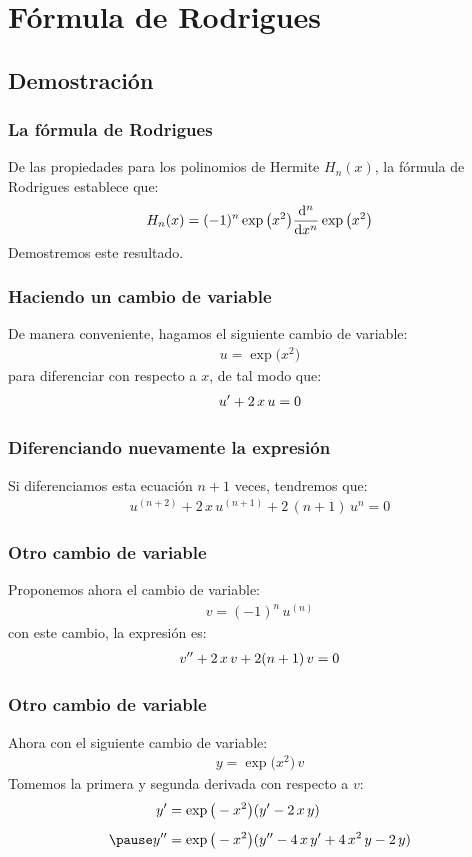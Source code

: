 \documentclass[12pt]{beamer}
\begin{document}
\section{Fórmula de Rodrigues}
\subsection{Demostración}

\begin{frame}
\frametitle{La fórmula de Rodrigues}
De las propiedades para los polinomios de Hermite $H_{n} (x)$, la fórmula de Rodrigues establece que:
\pause
\begin{align*}
H_{n} (x) = (-1)^{n} \exp\big( x^{2} \big) \dv[n]{x} \exp\big( x^{2} \big)
\end{align*}
\pause
Demostremos este resultado.
\end{frame}
\begin{frame}
\frametitle{Haciendo un cambio de variable}
De manera conveniente, hagamos el siguiente cambio de variable:
\pause
\begin{align*}
u =  \exp\big( x^{2} \big)
\end{align*}
\pause
para diferenciar con respecto a $x$, de tal modo que:
\pause
\begin{align*}
{u}^{\prime} + 2 \, x \, u = 0
\end{align*}
\end{frame}
\begin{frame}
\frametitle{Diferenciando nuevamente la expresión}
Si diferenciamos esta ecuación $n + 1$ veces, tendremos que:
\pause
\begin{align*}
u^{(n+2)} + 2 \, x \, u^{(n+1)} +  2 \, (n + 1) \, u^{n} = 0
\end{align*}
\end{frame}
\begin{frame}
\frametitle{Otro cambio de variable}
Proponemos ahora el cambio de variable:
\pause
\begin{align*}
v = (-1)^{n} \, u^{(n)}
\end{align*}
\pause
con este cambio, la expresión es:
\pause
\begin{align}
{v}^{\prime \prime} + 2 \, x \, v + 2 (n + 1) \, v = 0
\label{eq:ecuacion_18_131}
\end{align}
\end{frame}
\begin{frame}
\frametitle{Otro cambio de variable}
Ahora con el siguiente cambio de variable:
\pause
\begin{align*}
y = \exp\big( x^{2} \big) \, v
\end{align*}
\pause
Tomemos la primera y segunda derivada con respecto a $v$:
\begin{eqnarray*}
\begin{aligned}
\pderivada{y} &= \exp\big( - x^{2} \big) ( \pderivada{y} - 2 \, x \, y) \\[0.5em] \pause
\sderivada{y} &= \exp\big( - x^{2} \big) ( \sderivada{y} - 4 \, x \, \pderivada{y} + 4 \, x^{2} \, y - 2 \, y)
\end{aligned}
\end{eqnarray*}
\end{frame}
\end{document}
